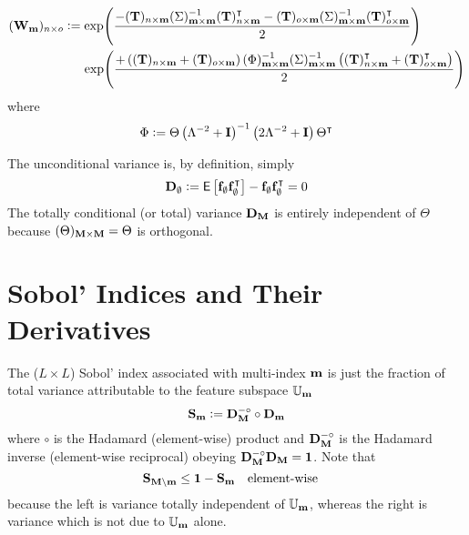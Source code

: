 \documentclass[a4paper, margin=1in, reqno]{RAMArticle}
\begin{document}
		\begin{equation*}
			\begin{aligned}
				(\mathbf{W}_{\mathbf{m}})_{n \times o} &\mathrel{\mathop:}=
				\exp\!\left(\frac{
					-(\mathbf{T})_{n\times\mathbf{m}}(\Sigma)_{\mathbf{m}\times\mathbf{m}}^{-1}
					(\mathbf{T})_{n\times\mathbf{m}}^{\intercal} 
					-(\mathbf{T})_{o\times\mathbf{m}}(\Sigma)_{\mathbf{m}\times\mathbf{m}}^{-1}
					(\mathbf{T})_{o\times\mathbf{m}}^{\intercal}
					}{2}\right) \\
					&\phantom{deq} \exp\!\left(\frac{
						+ \left((\mathbf{T})_{n\times\mathbf{m}}+(\mathbf{T})_{o\times\mathbf{m}}\right)
						(\Phi)_{\mathbf{m}\times\mathbf{m}}^{-1}(\Sigma)_{\mathbf{m}\times\mathbf{m}}^{-1}
						\left((\mathbf{T})_{n\times\mathbf{m}}^{\intercal}+(\mathbf{T})_{o\times\mathbf{m}}^{\intercal}\right)
						}{2}\right)
			\end{aligned}
		\end{equation*}
		where
		\begin{equation}\label{eq:ANOVA:qdef}
			\Phi \mathrel{\mathop:}= \Theta \left(\Lambda^{-2}+\mathbf{I}\right)^{-1}\left(2\Lambda^{-2}+\mathbf{I}\right) 
			\Theta^{\intercal}
		\end{equation}
		
		The unconditional variance is, by definition, simply
		\begin{equation*}
			\mathbf{D}_{\emptyset} \mathrel{\mathop:}= \mathsf{E}\left[
			\mathbf{f}_{\emptyset}\mathbf{f}^{\intercal}_{\emptyset}
			\right]
			- \mathbf{f}_{\emptyset}\mathbf{f}^{\intercal}_{\emptyset}
			= 0
		\end{equation*}
		The totally conditional (or total) variance \(\mathbf{D}_{\mathbf{M}}\) is entirely independent of \(\Theta\) because \((\Theta)_{\mathbf{M}\times\mathbf{M}}=\Theta\) is orthogonal.	


\section{Sobol' Indices and Their Derivatives}
	The (\(L\times L\)) Sobol' index associated with multi-index \(\mathbf{m}\) is just the fraction of 
	total variance attributable to the feature subspace \(\mathbb{U}_{\mathbf{m}}\)
	\begin{equation*}
		\mathbf{S}_{\mathbf{m}} \mathrel{\mathop:}= \mathbf{D}_{\mathbf{M}}^{-\circ}\circ\mathbf{D}_{\mathbf{m}}
	\end{equation*}
	where \(\circ\) is the Hadamard (element-wise) product and \(\mathbf{D}_{\mathbf{M}}^{-\circ}\) is the Hadamard inverse 
	(element-wise reciprocal) obeying \(\mathbf{D}_{\mathbf{M}}^{-\circ}\mathbf{D}_{\mathbf{M}} = \mathbf{1}\).
	Note that
	\begin{equation*}
		\vr{S}_{\vr{M}\setminus\vr{m}} \leq \vr{1} - \vr{S}_{\vr{m}} \QT{element-wise}
	\end{equation*}
	because the left is variance totally independent of \(\mathbb{U}_{\mathbf{m}}\), whereas the right is variance which is not due to \(\mathbb{U}_{\mathbf{m}}\) alone.
\end{document}
